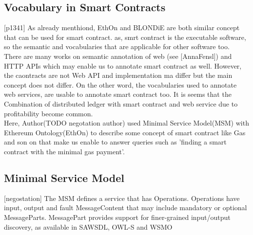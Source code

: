 \subsection{Vocabulary in Smart Contracts}[p1341]
As already menthiond, EthOn and BLONDiE are both similar concept that can be used for smart contract. as, smrt contract is the executable  software, so the semantic and vocabularies that are applicable for other software too.\\
There are many works on semantic annotation of web (see [AnnaFensl]) and HTTP APIs which may enable us to annotate smart contract as well. However, the caontracts are not Web API and implementation ma differ but the main concept does not differ.  On the other word, the vocabularies used to annotate web services, are usable to annotate smart contract too. It is seems that the Combination of distributed ledger with smart contract and web service due to profitability  become common.
\\ Here, Author(TODO negotation author) used Minimal Service Model(MSM) with Ethereum Ontology(EthOn) to describe some concept of smart contract like Gas and son on that make us enable to answer queries such as 'finding a smart contract with the minimal gas payment'.

\subsection{Minimal Service Model}[negostation]
The MSM defines a service that has Operations. Operations   have input, output and fault MessageContent that may include mandatory or optional MessageParts. MessagePart provides support for finer-grained input/output discovery, as available in SAWSDL, OWL-S and WSMO

